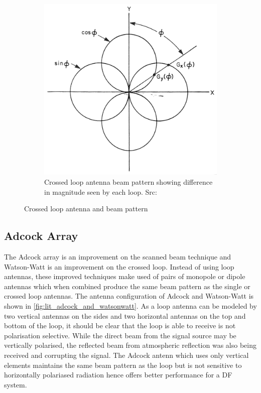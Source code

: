 \begin{figure}
\begin{subfigure}[b]{0.4\textwidth}
    \includegraphics[width=\textwidth]{./img/lit_review/loop_antenna_crossed_beam}
    \caption{Crossed loop antenna beam pattern showing difference in magnitude seen by each loop. Src: \cite{jenkins1991smallaperture}}
  \end{subfigure}
  \caption{Crossed loop antenna and beam pattern}
  \label{fig:lit_crossed_loop_antenna}
\end{figure}

\subsection{Adcock Array}
The Adcock array is an improvement on the scanned beam technique and Watson-Watt is an improvement on the crossed loop. Instead of using loop antennas, these improved techniques make used of pairs of monopole or dipole antennas which when combined produce the same beam pattern as the single or crossed loop antennas. The antenna configuration of Adcock and Watson-Watt is shown in \autoref{fig:lit_adcock_and_watsonwatt}.
As a loop antenna can be modeled by two vertical antennas on the sides and two horizontal antennas on the top and bottom of the loop, it should be clear that the loop is able to receive is not polarisation selective. While the direct beam from the signal source may be vertically polarised, the reflected beam from atmospheric reflection was also being received and corrupting the signal.
The Adcock antenn which uses only vertical elements maintains the same beam pattern as the loop but is not sensitive to horizontally polariased radiation hence offers better performance for a DF system.


